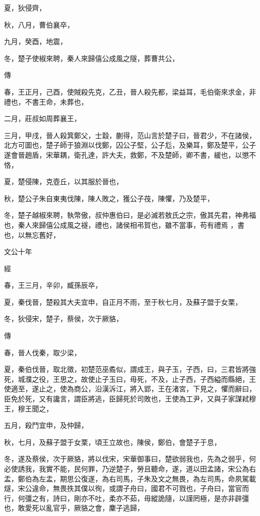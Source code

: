 \documentclass{ctexart}
\begin{document}
夏，狄侵齊，

秋，八月，曹伯襄卒，

九月，癸酉，地震，

冬，楚子使椒來聘，秦人來歸僖公成風之隧，葬曹共公，

傳



春，王正月，己酉，使賊殺先克，乙丑，晉人殺先都，梁益耳，毛伯衛來求金，非禮也，不書王命，未葬也，

二月，莊叔如周葬襄王，

三月，甲戌，晉人殺箕鄭父，士縠，蒯得，范山言於楚子曰，晉君少，不在諸侯，北方可圖也，楚子師于狼淵以伐鄭，囚公子堅，公子尨，及樂耳，鄭及楚平，公子遂會晉趙盾，宋華耦，衛孔達，許大夫，救鄭，不及楚師，卿不書，緩也，以懲不恪，

夏，楚侵陳，克壺丘，以其服於晉也，

秋，楚公子朱自東夷伐陳，陳人敗之，獲公子茷，陳懼，乃及楚平，

冬，楚子越椒來聘，執幣傲，叔仲惠伯曰，是必滅若敖氏之宗，傲其先君，神弗福也，秦人來歸僖公成風之襚，禮也，諸侯相弔賀也，雖不當事，苟有禮焉 ，書也，以無忘舊好，





文公十年


經



春，王三月，辛卯，臧孫辰卒，

夏，秦伐晉，楚殺其大夫宜申，自正月不雨，至于秋七月，及蘇子盟于女栗，

冬，狄侵宋，楚子，蔡侯，次于厥貉，

傳



春，晉人伐秦，取少梁，

夏，秦伯伐晉，取北徵，初楚范巫矞似，謂成王，與子玉，子西，曰，三君皆將強死，城濮之役，王思之，故使止子玉曰，毋死，不及，止子西，子西縊而縣絕，王使適至，遂止之，使為商公，沿漢泝江，將入郢，王在渚宮，下見之，懼而辭曰，臣免於死，又有讒言，謂臣將逃，臣歸死於司敗也，王使為工尹，又與子家謀弒穆王，穆王聞之，

五月，殺鬥宜申，及仲歸，

秋，七月，及蘇子盟于女栗，頃王立故也，陳侯，鄭伯，會楚子于息，

冬，遂及蔡侯，次于厥貉，將以伐宋，宋華御事曰，楚欲弱我也，先為之弱乎，何必使誘我，我實不能，民何罪，乃逆楚子，勞且聽命，遂，道以田孟諸，宋公為右盂，鄭伯為左盂，期思公復遂，為右司馬，子朱及文之無畏，為左司馬，命夙駕載燧，宋公違命，無畏抶其僕以徇，或謂子舟曰，國君不可戮也，子舟曰，當官而行，何彊之有，詩曰，剛亦不吐，柔亦不茹，毋縱詭隨，以謹罔極，是亦非辟彊也，敢愛死以亂官乎，厥貉之會，麇子逃歸，
\end{document}
